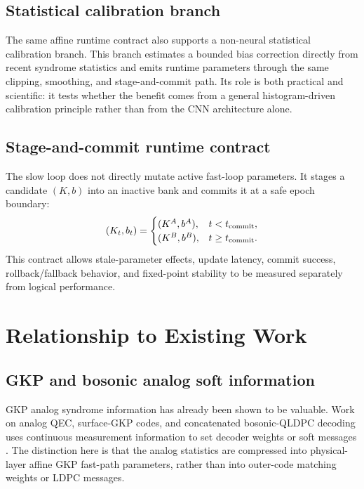 \documentclass[11pt]{article}
\begin{document}
\subsection{Statistical calibration branch}

The same affine runtime contract also supports a non-neural statistical
calibration branch.  This branch estimates a bounded bias correction directly
from recent syndrome statistics and emits runtime parameters through the same
clipping, smoothing, and stage-and-commit path.  Its role is both practical and
scientific: it tests whether the benefit comes from a general histogram-driven
calibration principle rather than from the CNN architecture alone.

\subsection{Stage-and-commit runtime contract}

The slow loop does not directly mutate active fast-loop parameters.  It stages
a candidate \((K,b)\) into an inactive bank and commits it at a safe epoch
boundary:
\begin{equation}
(K_t,b_t)=
\begin{cases}
(K^A,b^A), & t<t_{\rm commit},\\
(K^B,b^B), & t\ge t_{\rm commit}.
\end{cases}
\end{equation}
This contract allows stale-parameter effects, update latency, commit success,
rollback/fallback behavior, and fixed-point stability to be measured
separately from logical performance.

\section{Relationship to Existing Work}

\subsection{GKP and bosonic analog soft information}

GKP analog syndrome information has already been shown to be valuable.  Work
on analog QEC, surface-GKP codes, and concatenated bosonic-QLDPC decoding uses
continuous measurement information to set decoder weights or soft messages
\cite{fukui2018,noh2020,noh2022,raveendran2022,berent2024,borah2025}.  The
distinction here is that the analog statistics are compressed into
physical-layer affine GKP fast-path parameters, rather than into outer-code
matching weights or LDPC messages.
\end{document}
